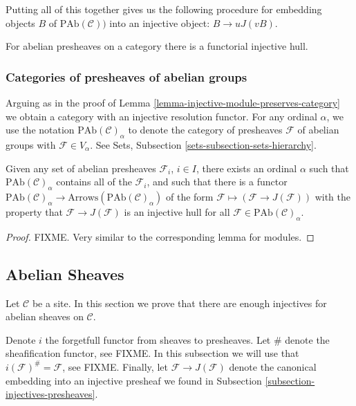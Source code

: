 \smallskip\noindent
Putting all of this together gives us the following procedure
for embedding objects $B$ of $\text{PAb}(\mathcal{C}))$ into
an injective object: $B \to uJ(vB)$.

\begin{proposition}
\label{proposition-presheaves-injectives}
For abelian presheaves on a category there is a functorial injective hull.
\end{proposition}

\subsubsection{Categories of presheaves of abelian groups}
\label{subsubsection-category-presheaves}

\noindent
Arguing as in the proof of
Lemma \ref{lemma-injective-module-preserves-category} we obtain a category
with an injective resolution functor. For any ordinal $\alpha$,
we use the notation $\text{PAb}(\mathcal{C})_\alpha$ to denote the category
of presheaves $\mathcal{F}$ of abelian groups with $\mathcal{F} \in V_\alpha$.
See Sets, Subsection \ref{sets-subsection-sets-hierarchy}.

\begin{lemma} 
\label{lemma-injective-presheaf-preserves-category}
Given any set of abelian presheaves $\mathcal{F}_i$, $i\in I$, there
exists an ordinal $\alpha$ such that $\text{PAb}(\mathcal{C})_\alpha$
contains all of the $\mathcal{F}_i$, and such that there is a functor
$\text{PAb}(\mathcal{C})_\alpha \to
\text{Arrows}(\text{PAb}(\mathcal{C})_\alpha)$
of the form $\mathcal{F} \mapsto (\mathcal{F} \to J(\mathcal{F}))$
with the property that $\mathcal{F} \to J(\mathcal{F})$ is an injective
hull for all $\mathcal{F} \in \text{PAb}(\mathcal{C})_\alpha$.
\end{lemma}

\begin{proof}
FIXME. Very similar to the corresponding lemma for modules.
\end{proof}

\subsection{Abelian Sheaves}
\label{subsection-injectives-sheaves}

\noindent
Let $\mathcal{C}$ be a site. In this section we prove that there are 
enough injectives for abelian sheaves on $\mathcal{C}$. 

\smallskip\noindent
Denote $i$ the forgetfull functor from sheaves to presheaves. Let
$\#$ denote the sheafification functor, see FIXME. In this subsection we
will use that $i(\mathcal{F})^\# = \mathcal{F}$, see FIXME.
Finally, let $\mathcal{F} \to J(\mathcal{F})$ denote the canonical
embedding into an injective presheaf we found in 
Subsection \ref{subsection-injectives-presheaves}. 

